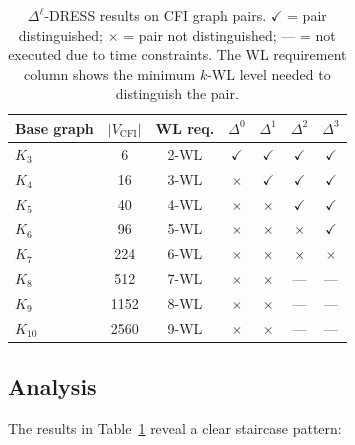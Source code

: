 \documentclass[11pt,a4paper]{article}
\begin{document}
\begin{table}[h]
\centering
\caption{$\Delta^\ell$-DRESS results on CFI graph pairs. $\checkmark$ = pair distinguished; $\times$ = pair not distinguished; --- = not executed due to time constraints. The WL requirement column shows the minimum $k$-WL level needed to distinguish the pair.}
\label{tab:cfi-results}
\begin{tabular}{@{}lcccccc@{}}
\toprule
Base graph & $|V_{\text{CFI}}|$ & WL req. & $\Delta^0$ & $\Delta^1$ & $\Delta^2$ & $\Delta^3$ \\
\midrule
$K_3$   & 6     & 2-WL & $\checkmark$  & $\checkmark$  & $\checkmark$  & $\checkmark$  \\
$K_4$   & 16    & 3-WL & $\times$      & $\checkmark$  & $\checkmark$  & $\checkmark$  \\
$K_5$   & 40    & 4-WL & $\times$      & $\times$      & $\checkmark$  & $\checkmark$  \\
$K_6$   & 96    & 5-WL & $\times$      & $\times$      & $\times$      & $\checkmark$  \\
$K_7$   & 224   & 6-WL & $\times$      & $\times$      & $\times$      & $\times$      \\
$K_8$   & 512   & 7-WL & $\times$      & $\times$      & ---            & ---            \\
$K_9$   & 1152  & 8-WL & $\times$      & $\times$      & ---            & ---            \\
$K_{10}$& 2560  & 9-WL & $\times$      & $\times$      & ---            & ---            \\
\bottomrule
\end{tabular}
\end{table}

\subsection{Analysis}

The results in Table~\ref{tab:cfi-results} reveal a clear staircase pattern:
\end{document}
